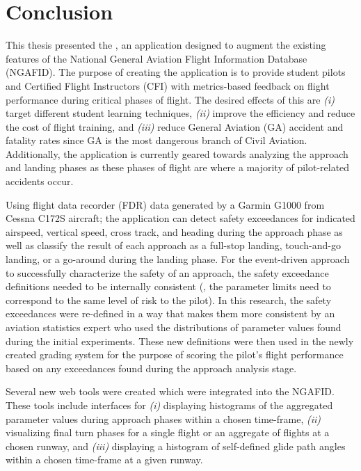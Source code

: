 
\chapter{Conclusion} \label{ch:conclusion}
	
	This thesis presented the \toolname, an application designed to augment the existing features of the National General Aviation Flight Information Database (NGAFID).  The purpose of creating the application is to provide student pilots and Certified Flight Instructors (CFI) with metrics-based feedback on flight performance during critical phases of flight.  The desired effects of this are \textit{(i)} target different student learning techniques, \textit{(ii)} improve the efficiency and reduce the cost of flight training, and \textit{(iii)} reduce General Aviation (GA) accident and fatality rates since GA is the most dangerous branch of Civil Aviation.  Additionally, the application is currently geared towards analyzing the approach and landing phases as these phases of flight are where a majority of pilot-related accidents occur.
	
	Using flight data recorder (FDR) data generated by a Garmin G1000 from Cessna C172S aircraft; the application can detect safety exceedances for indicated airspeed, vertical speed, cross track, and heading during the approach phase as well as classify the result of each approach as a full-stop landing, touch-and-go landing, or a go-around during the landing phase.  For the event-driven approach to successfully characterize the safety of an approach, the safety exceedance definitions needed to be internally consistent (\ie, the parameter limits need to correspond to the same level of risk to the pilot).  In this research, the safety exceedances were re-defined in a way that makes them more consistent by an aviation statistics expert who used the distributions of parameter values found during the initial experiments.  These new definitions were then used in the newly created grading system for the purpose of scoring the pilot's flight performance based on any exceedances found during the approach analysis stage.
	
	Several new web tools were created which were integrated into the NGAFID.  These tools include interfaces for \textit{(i)} displaying histograms of the aggregated parameter values during approach phases within a chosen time-frame, \textit{(ii)} visualizing final turn phases for a single flight or an aggregate of flights at a chosen runway, and \textit{(iii)} displaying a histogram of self-defined glide path angles within a chosen time-frame at a given runway.
	

